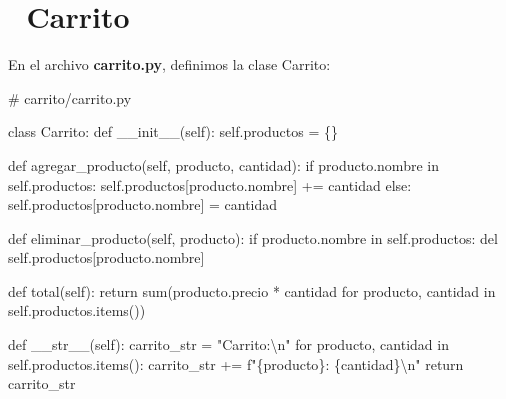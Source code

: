 \documentclass[
  a4paper,
  DIV=11,
  numbers=noendperiod,
  onepage,
  openany]{scrreprt}
\newenvironment{Shaded}{\begin{snugshade}}{\end{snugshade}}
\newcommand{\BuiltInTok}[1]{\textcolor[rgb]{0.00,0.23,0.31}{#1}}
\newcommand{\CharTok}[1]{\textcolor[rgb]{0.13,0.47,0.30}{#1}}
\newcommand{\CommentTok}[1]{\textcolor[rgb]{0.37,0.37,0.37}{#1}}
\newcommand{\ControlFlowTok}[1]{\textcolor[rgb]{0.00,0.23,0.31}{#1}}
\newcommand{\FunctionTok}[1]{\textcolor[rgb]{0.28,0.35,0.67}{#1}}
\newcommand{\KeywordTok}[1]{\textcolor[rgb]{0.00,0.23,0.31}{#1}}
\newcommand{\NormalTok}[1]{\textcolor[rgb]{0.00,0.23,0.31}{#1}}
\newcommand{\OperatorTok}[1]{\textcolor[rgb]{0.37,0.37,0.37}{#1}}
\newcommand{\SpecialCharTok}[1]{\textcolor[rgb]{0.37,0.37,0.37}{#1}}
\newcommand{\SpecialStringTok}[1]{\textcolor[rgb]{0.13,0.47,0.30}{#1}}
\newcommand{\StringTok}[1]{\textcolor[rgb]{0.13,0.47,0.30}{#1}}
\newcommand{\VariableTok}[1]{\textcolor[rgb]{0.07,0.07,0.07}{#1}}
\begin{document}
\section{🛒 Carrito}\label{carrito}

En el archivo \textbf{carrito.py}, definimos la clase Carrito:

\begin{Shaded}
\begin{Highlighting}[]
\CommentTok{\# carrito/carrito.py}

\KeywordTok{class}\NormalTok{ Carrito:}
    \KeywordTok{def} \FunctionTok{\_\_init\_\_}\NormalTok{(}\VariableTok{self}\NormalTok{):}
        \VariableTok{self}\NormalTok{.productos }\OperatorTok{=}\NormalTok{ \{\}}

    \KeywordTok{def}\NormalTok{ agregar\_producto(}\VariableTok{self}\NormalTok{, producto, cantidad):}
        \ControlFlowTok{if}\NormalTok{ producto.nombre }\KeywordTok{in} \VariableTok{self}\NormalTok{.productos:}
            \VariableTok{self}\NormalTok{.productos[producto.nombre] }\OperatorTok{+=}\NormalTok{ cantidad}
        \ControlFlowTok{else}\NormalTok{:}
            \VariableTok{self}\NormalTok{.productos[producto.nombre] }\OperatorTok{=}\NormalTok{ cantidad}

    \KeywordTok{def}\NormalTok{ eliminar\_producto(}\VariableTok{self}\NormalTok{, producto):}
        \ControlFlowTok{if}\NormalTok{ producto.nombre }\KeywordTok{in} \VariableTok{self}\NormalTok{.productos:}
            \KeywordTok{del} \VariableTok{self}\NormalTok{.productos[producto.nombre]}

    \KeywordTok{def}\NormalTok{ total(}\VariableTok{self}\NormalTok{):}
        \ControlFlowTok{return} \BuiltInTok{sum}\NormalTok{(producto.precio }\OperatorTok{*}\NormalTok{ cantidad }\ControlFlowTok{for}\NormalTok{ producto, cantidad }\KeywordTok{in} \VariableTok{self}\NormalTok{.productos.items())}

    \KeywordTok{def} \FunctionTok{\_\_str\_\_}\NormalTok{(}\VariableTok{self}\NormalTok{):}
\NormalTok{        carrito\_str }\OperatorTok{=} \StringTok{"Carrito:}\CharTok{\textbackslash{}n}\StringTok{"}
        \ControlFlowTok{for}\NormalTok{ producto, cantidad }\KeywordTok{in} \VariableTok{self}\NormalTok{.productos.items():}
\NormalTok{            carrito\_str }\OperatorTok{+=} \SpecialStringTok{f"}\SpecialCharTok{\{}\NormalTok{producto}\SpecialCharTok{\}}\SpecialStringTok{: }\SpecialCharTok{\{}\NormalTok{cantidad}\SpecialCharTok{\}}\CharTok{\textbackslash{}n}\SpecialStringTok{"}
        \ControlFlowTok{return}\NormalTok{ carrito\_str}
\end{Highlighting}
\end{Shaded}
\end{document}
